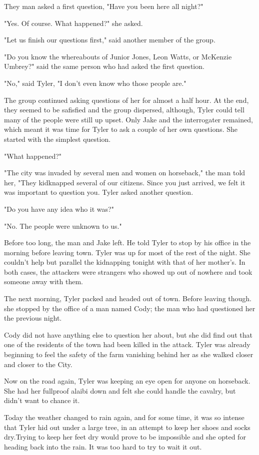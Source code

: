 \documentclass[courier]{sffms}
\begin{document}
They man asked a first question, "Have you been here all night?"

"Yes. Of course. What happened?" she asked.

"Let us finish our questions first," said another member of the group.

"Do you know the whereabouts
of Junior Jones, Leon Watts, or McKenzie Umbrey?" said the same
person who had asked the first question.

"No," said Tyler, "I don't even know who those people are."

The group continued asking questions of her for almost a half hour.
At the end, they seemed to be safisfied and the group dispersed,
although, Tyler could tell many of the people were still up upset.
Only Jake and the interrogater remained, which meant it was time
for Tyler to ask a couple of her own questions. She started with
the simplest question.

"What happened?"

"The city was invaded by several men and women on horseback,"
the man told her, "They kidknapped several of our citizens. Since
you just arrived, we felt it was important to question you. Tyler
asked another question.

"Do you have any idea who it was?"

"No. The people were unknown to us."

Before too long, the man and Jake left. He told Tyler to
stop by his office in the morning before leaving town.
Tyler was up for most of
the rest of the night. She couldn't help but parallel the kidnapping
tonight with that of her mother's. In both cases, the attackers
were strangers who showed up out of nowhere and took someone
away with them.

The next morning, Tyler packed and headed out of town. Before
leaving though. she stopped by the office of a man named Cody;
the man who had questioned her the previous night.

Cody did not have anything else to question her about, but she
did find out that one of the residents of the town had been killed
in the attack. Tyler was already beginning to feel the safety of the
farm vanishing behind her as she walked closer and closer to the
City.

Now on the road again, Tyler was keeping an eye open for anyone
on horseback. She had her fullproof alaibi down and felt she could
handle the cavalry, but didn't want to chance it.

Today the weather changed to rain again, and for some time, it
was so intense that Tyler hid out under a large tree, in an attempt
to keep her shoes and socks dry.Trying to keep her feet dry would prove to be impossible
and she opted for heading back into the rain. It was too
hard to try to wait it out.
\end{document}
